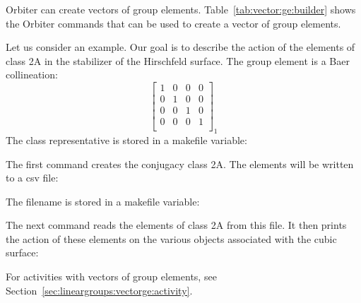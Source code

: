 Orbiter can create vectors of group elements. 
Table~\ref{tab:vector:ge:builder} 
shows the Orbiter commands that can be used to create 
a vector of group elements.






Let us consider an example. 
Our goal is to describe the action of the elements of class 2A in 
the stabilizer of the Hirschfeld surface. 
The group 
element is a Baer collineation:
$$
\left[
\begin{array}{cccc}
1&0&0&0\\
0&1&0&0\\
0&0&1&0\\
0&0&0&1\\
\end{array}
\right]_1
$$
The class representative is stored in a makefile variable:



The first command creates the conjugacy class 2A. 
The elements will be written to a csv file:


The filename is stored in a makefile variable:



The next command reads the elements of class 2A from this file. 
It then prints the action of these elements on 
the various objects associated with the cubic surface:



For activities with vectors of group elements, 
see Section~\ref{sec:lineargroups:vectorge:activity}.